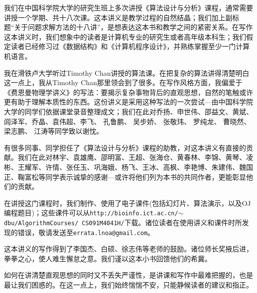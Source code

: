 我们在中国科学院大学的研究生班上多次讲授《算法设计与分析》课程，通常需要讲授一个学期、共十八次课。这本讲义是教学过程的自然结晶；我们加上副标题“关于问题求解方法的十八讲”，是想表达这本书和教学之间的紧密关系。在写作这本讲义时，我们想象中的读者是计算机专业的研究生或者高年级本科生；我们假定读者已经修习过《数据结构》和《计算机程序设计》，并熟练掌握至少一门计算机语言。


我在滑铁卢大学听过Timothy Chan讲授的算法课。在把复杂的算法讲得清楚明白这一点上，我从Timothy Chan那里领会到了很多。在写作风格方面，我偏爱于《费恩曼物理学讲义》的写法：要揭示复杂事物背后的直观思想，自然的笔触或许更有助于理解本质性的东西。这份讲义是采用这种写法的一次尝试---由中国科学院大学的同学们依据课堂录音整理成文；我们在此对乔扬、申世伟、邵益文、黄斌、闾泽军、乔晶、袁伟超、李飞、 孔鲁鹏、 吴步娇、 张敬玮、 罗纯龙、 曹晓然、 梁志鹏、 江涛等同学致以谢忱。

有很多同事、同学担任了《算法设计与分析》课程的助教，对这本讲义有直接的贡献。我们在此对林宇、袁雄鹰、邵明富、王超、张海仓、黄春林、李锦、黄琴、凌彬、王耀军、许情、张任玉、巩海娥、杨飞、王冰、高枫、李艳博、朱建伟、魏国正、鞠富松等同学表示诚挚的感谢---或许将他们列为本书的共同作者，更能彰显他们的贡献。

在讲授这门课程时，我们制作、使用了电子课件(包括幻灯片、算法演示，以及OJ编程题目)；这些课件可以从{\tt http://bioinfo.ict.ac.cn/$\sim$dbu/AlgorithmCourses/ CS091M4041H/}下载。诸位读者在使用讲义和课件时所发现的错误，敬请发送至{\tt errata.lnoa@gmail.com}。

这本讲义的写作得到了李国杰、白硕、徐志伟等老师的鼓励。诸位师长奖掖后进，拳拳之心，使人难生懈怠之意。我们谨以这本小书回馈他们的希冀。


如何在讲清楚直观思想的同时又不丢失严谨性，是讲课和写作中最难把握的，也是最让我们困惑的。在这一点上，我们始终惴惴不安，只能静候读者的建议和指正。



